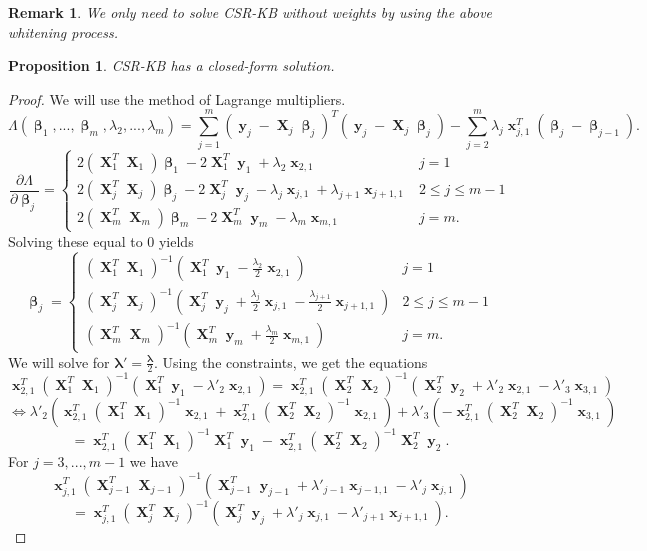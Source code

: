 \documentclass[12pt]{article}
\DeclareMathOperator{\bx}{\textbf{x}}
\DeclareMathOperator{\bX}{\textbf{X}}
\DeclareMathOperator{\by}{\textbf{y}}
\DeclareMathOperator{\bbeta}{\boldsymbol{\beta}}
\newtheorem{prop}{Proposition}
\newtheorem*{remark}{Remark}
\begin{document}
\begin{remark}
We only need to solve CSR-KB without weights by using the above whitening process.
\end{remark}
\begin{prop} \label{prop:main}
CSR-KB has a closed-form solution. 
\end{prop}
\begin{proof}
We will use the method of Lagrange multipliers.
$$\Lambda(\bbeta_1,...,\bbeta_m,\lambda_2,...,\lambda_m) =  \sum_{j=1}^m (\by_j-\bX_j\bbeta_j)^T(\by_j-\bX_j\bbeta_j)-\sum_{j=2}^m\lambda_j\bx_{j, 1}^T (\bbeta_j - \bbeta_{j-1}).$$
$$\frac{\partial \Lambda}{\partial \bbeta_j} = \begin{cases}
2(\bX_1^T  \bX_1)\bbeta_1 - 2\bX_1^T  \by_1 +\lambda_{2}\bx_{2, 1} & j=1 \\
2(\bX_j^T  \bX_j)\bbeta_j - 2\bX_j^T  \by_j - \lambda_j\bx_{j, 1}+\lambda_{j+1}\bx_{j+1, 1} & 2 \leq j \leq m-1 \\
2(\bX_m^T \bX_m)\bbeta_m - 2\bX_m^T \by_m - \lambda_m\bx_{m, 1} & j=m.
\end{cases}$$
Solving these equal to $0$ yields
\begin{equation} \label{eqn:beta}
\bbeta_j=\begin{cases}
(\bX_1^T  \bX_1)^{-1}(\bX_1^T \by_1 -\frac{\lambda_{2}}{2}\bx_{2, 1}) & j=1 \\
(\bX_j^T  \bX_j)^{-1}(\bX_j^T \by_j + \frac{\lambda_j}{2}\bx_{j, 1}-\frac{\lambda_{j+1}}{2}\bx_{j+1, 1}) & 2 \leq j \leq m-1 \\
(\bX_m^T \bX_m)^{-1}(\bX_m^T \by_m + \frac{\lambda_m}{2}\bx_{m, 1}) & j=m.
\end{cases}
\end{equation}
We will solve for $\boldsymbol{\lambda}'=\frac{\boldsymbol{\lambda}}{2}$. Using the constraints, we get the equations
$$\bx_{2,1}^T(\bX_1^T  \bX_1)^{-1}\left(\bX_1^T \by_1 -\lambda'_{2}\bx_{2, 1}\right)=\bx_{2,1}^T(\bX_2^T  \bX_2)^{-1}\left(\bX_2^T\by_2 + \lambda'_{2}\bx_{2, 1}-\lambda'_{3}\bx_{3, 1}\right) $$
$$\iff \lambda'_{2}\left(\bx_{2,1}^T(\bX_1^T \bX_1)^{-1}\bx_{2, 1}+\bx_{2,1}^T(\bX_2^T \bX_2)^{-1}\bx_{2, 1} \right) + \lambda'_3\left(-\bx_{2,1}^T(\bX_2^T \bX_2)^{-1}\bx_{3, 1} \right) $$
$$=\bx_{2,1}^T(\bX_1^T  \bX_1)^{-1}\bX_1^T \by_1-\bx_{2,1}^T(\bX_2^T  \bX_2)^{-1}\bX_2^T \by_2.$$
For $j=3, ..., m-1$ we have
$$\bx_{j,1}^T(\bX_{j-1}^T  \bX_{j-1})^{-1}\left(\bX_{j-1}^T  \by_{j-1} + \lambda'_{j-1}\bx_{j-1, 1}-\lambda'_{j}\bx_{j, 1}\right)$$
$$= \bx_{j,1}^T(\bX_j^T  \bX_j)^{-1}\left( \bX_j^T \by_j + \lambda'_{j}\bx_{j, 1} -\lambda'_{j+1}\bx_{j+1, 1}\right).$$

\end{proof}
\end{document}
